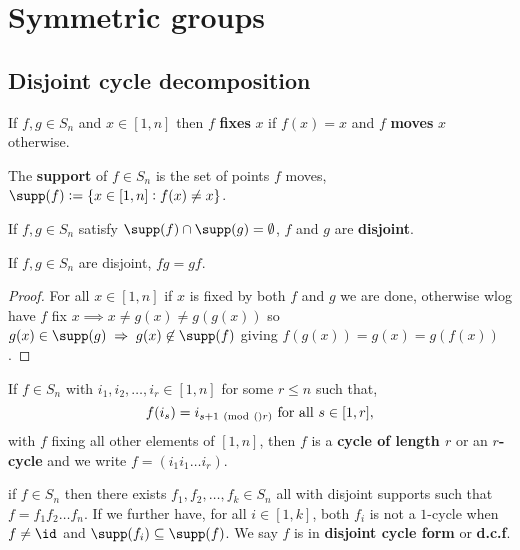 \documentclass[../Year1.tex]{subfiles}
\begin{document}
\section{Symmetric groups}

\subsection{Disjoint cycle decomposition}

\begin{definition}
    If $f,g\in S_n$ and $x\in[1,n]$ then $f$ \textbf{fixes} $x$ if $f(x)=x$ and $f$ \textbf{moves} $x$ otherwise. 
\end{definition}

\begin{definition}
    The \textbf{support} of $f\in S_n$ is the set of points $f$ moves, $\supp(f):=\{x\in[1,n]:f(x)\neq x\}$.
\end{definition}

\begin{definition}
    If $f,g\in S_n$ satisfy $\supp(f)\cap\supp(g)=\emptyset$, $f$ and $g$ are \textbf{disjoint}.
\end{definition}

\begin{lemma}
    If $f,g\in S_n$ are disjoint, $fg=gf$.
\end{lemma}

\begin{proof}
    For all $x\in[1,n]$ if $x$ is fixed by both $f$ and $g$ we are done, otherwise wlog have $f$ fix $x\implies x\neq g(x)\neq g(g(x))$ so $g(x)\in\supp(g)\implies g(x)\not\in\supp(f)$ giving $f(g(x))=g(x)=g(f(x))$.
\end{proof}

\begin{definition}[Cycles]
    If $f\in S_n$ with $i_1,i_2,\ldots,i_r\in[1,n]$ for some $r\leq n$ such that, \[
        f(i_s) = i_{s+1 \mod(r)} \ \text{\textcolor{black}{for all }} s\in[1,r]
    \textcolor{black}{,}
    \] with $f$ fixing all other elements of $[1,n]$, then $f$ is a \textbf{cycle of length $r$} or an \textbf{$r$-cycle} and we write $f=(i_1i_1\ldots i_r)$.
\end{definition}

\begin{theorem}
    if $f\in S_n$ then there exists $f_1,f_2,\ldots,f_k\in S_n$ all with disjoint supports such that $f=f_1f_2\ldots f_n$. If we further have, for all $i\in[1,k]$, both $f_i$ is not a $1$-cycle when $f\neq \id$ and $\supp(f_i)\subseteq\supp(f)$. We say $f$ is in \textbf{disjoint cycle form} or \textbf{d.c.f}.
\end{theorem}
\end{document}
